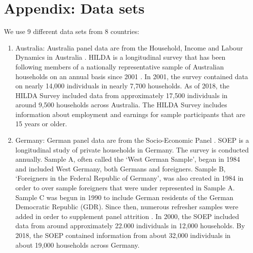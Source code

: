 \clearpage
\appendix


\section{Appendix: Data sets}\label{appendix:data}
\setcounter{figure}{0}    
\setcounter{table}{0}    
\renewcommand*\thetable{\Alph{section}.\arabic{table}}
\renewcommand*\thefigure{\Alph{section}.\arabic{figure}}
\renewcommand{\theHfigure}{\Alph{section}.\arabic{table}}
\renewcommand{\theHtable}{\Alph{section}.\arabic{figure}}

We use 9 different data sets from 8 countries:

\begin{enumerate}
    \item Australia: Australia panel data are from the Household, Income and Labour Dynamics in Australia \citep{hilda_household_2022}.  HILDA is a longitudinal survey that has been following members of a nationally representative sample of Australian households on an annual basis since 2001 \citep{watson_wooden_2012}.  In 2001, the survey contained data on nearly 14,000 individuals in nearly 7,700 households.  As of 2018, the HILDA Survey included data from approximately 17,500 individuals in around 9,500 households across Australia.  The HILDA Survey includes information about employment and earnings for sample participants that are 15 years or older.  

    \item Germany: German panel data are from the Socio-Economic Panel \citep{soep_2020}.  SOEP is a longitudinal study of private households in Germany.  The survey is conducted annually.  Sample A, often called the `West German Sample', began in 1984 and included West Germany, both Germans and foreigners.  Sample B, `Foreigners in the Federal Republic of Germany', was also created in 1984 in order to over sample foreigners that were under represented in Sample A.  Sample C was begun in 1990 to include German residents of the German Democratic Republic (GDR).  Since then, numerous refresher samples were added in order to supplement panel attrition \citep{soep_jan_2019}.  In 2000, the SOEP included data from around approximately 22.000 individuals in 12,000 households. By 2018, the SOEP contained information from about 32,000 individuals in about 19,000 households across Germany.


\end{enumerate}
